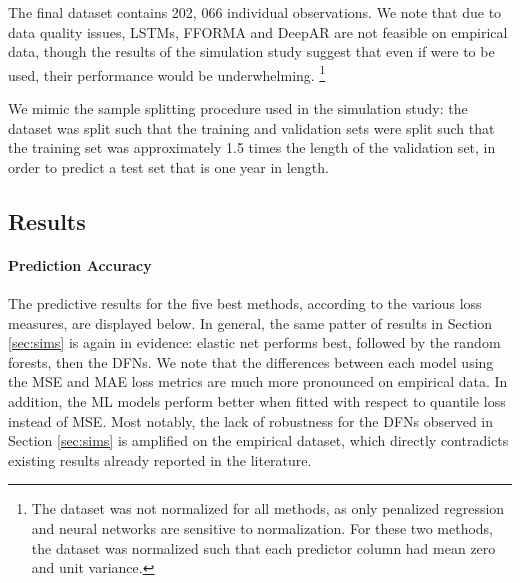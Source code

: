 \documentclass{article}
\begin{document}
The final dataset contains 202, 066 individual observations. We note that due to data quality issues, LSTMs, FFORMA and DeepAR are not feasible on empirical data, though the results of the simulation study suggest that even if were to be used, their performance would be underwhelming. \footnote{The dataset was not normalized for all methods, as only penalized regression and neural networks are sensitive to normalization. For these two methods, the dataset was normalized such that each predictor column had mean zero and unit variance.}

We mimic the sample splitting procedure used in the simulation study: the dataset was split such that the training and validation sets were split such that the training set was approximately 1.5 times the length of the validation set, in order to predict a test set that is one year in length.

\subsection{Results}



\paragraph{Prediction Accuracy}
The predictive results for the five best methods, according to the various loss measures, are displayed below. In general, the same patter of results in Section \ref{sec:sims} is again in evidence:  elastic net performs best, followed by the random forests, then the DFNs. We note that the differences between each model using the MSE and MAE loss metrics are much more pronounced on empirical data. In addition, the ML models perform better when fitted with respect to quantile loss instead of MSE. Most notably, the lack of robustness for the DFNs observed in Section \ref{sec:sims} is amplified on the empirical dataset, which directly contradicts existing results already reported in the literature.


\end{document}
